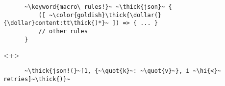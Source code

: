 \documentclass[usepdftitle=false,aspectratio=169]{beamer}
\newcommand{\dollar}{\makebox[\widthof{\$}][c]{\$}}
\newcommand{\thick}[1]{\contourlength{0.16pt}\contour[10]{black}{#1}}
\newcommand{\slantbox}[2][.5]
  {%
    \mbox
      {%
        \sbox{\foobox}{#2}%
        \hskip\wd\foobox
        \pdfsave
        \pdfsetmatrix{1 0 #1 1}%
        \llap{\usebox{\foobox}}%
        \pdfrestore
      }%
  }
\newcommand{\backslantbox}[2][.5]
  {%
    \mbox
      {%
        \sbox{\foobox}{#2}%
        \hskip\wd\foobox
        \pdfsave
        \pdfsetmatrix{-1 0 #1 1}%
        \llap{\usebox{\foobox}}%
        \pdfrestore
      }%
  }
\newcommand{\hi}[1]{%
\tikz[baseline=(A.base)]
 \node[highlighting=yellowbg,inner sep=0pt,text depth=0pt] (A) {#1};%
}
\newcommand{\openquote}{\backslantbox[.2]{\hspace{11pt}''\hspace{-11pt}}}
\newcommand{\closequote}{\slantbox[-.2]{\hspace{2pt}''\hspace{-2pt}}}
\newcommand{\blackquote}[1]{\openquote#1\closequote}
\newcommand{\quot}[1]{{\color{redish}\blackquote{#1}}}
\newcommand{\keyword}[1]{\color{greenish}#1}
\begin{document}
\begin{frame}[fragile]
\begin{onlyenv}
\begin{verbatim}
      ~\keyword{macro\_rules!}~ ~\thick{json}~ {
          ([ ~\color{goldish}\thick{\dollar(}{\dollar}content:tt\thick{)*}~ ]) => { ... }
          // other rules
      }
    \end{verbatim}
  \end{onlyenv}
  \begin{onlyenv}<+>
    \vspace{-20.5pt}
    \begin{verbatim}
      ~\thick{json!(}~[1, {~\quot{k}~: ~\quot{v}~}, i ~\hi{<}~ retries]~\thick{)}~


\end{verbatim}
\end{onlyenv}
\end{frame}
\end{document}
